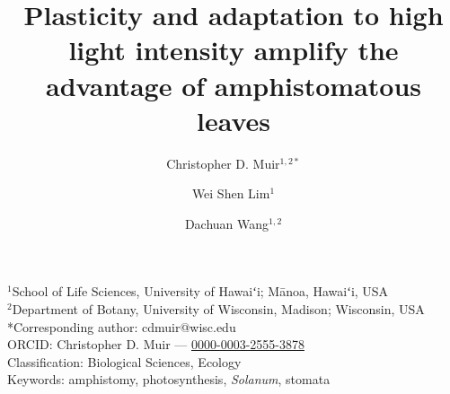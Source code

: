 \documentclass[
  letterpaper,
  DIV=11,
  numbers=noendperiod]{scrartcl}
\title{Plasticity and adaptation to high light intensity amplify the
advantage of amphistomatous leaves}
\author{Christopher D. Muir\(^{1,2*}\) \and Wei Shen
Lim\(^{1}\) \and Dachuan Wang\(^{1,2}\)}
\date{}
\begin{document}
\maketitle


\begin{center}
$^1$School of Life Sciences, University of Hawaiʻi; Mānoa, Hawaiʻi, USA\\
$^2$Department of Botany, University of Wisconsin, Madison; Wisconsin, USA\\
\medskip
*Corresponding author: cdmuir@wisc.edu\\
\medskip
ORCID: Christopher D. Muir — \href{https://orcid.org/0000-0003-2555-3878}{0000-0003-2555-3878}\\
\medskip
Classification: Biological Sciences, Ecology\\
\medskip
Keywords: amphistomy, photosynthesis, \textit{Solanum}, stomata
\end{center}
\end{document}
